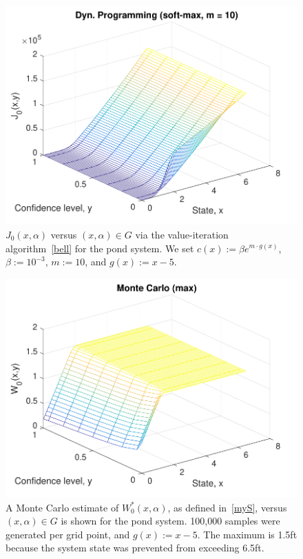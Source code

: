 \documentclass[letterpaper, 10 pt, conference]{ieeeconf}  %
\begin{document}
\begin{figure}[thpb]
      \centering
      \includegraphics[scale=0.5]{dyn_prog_J0_sept112018.pdf}
      \caption{$J_0(x,\alpha)$ versus $(x, \alpha) \in G$ via the value-iteration algorithm~\eqref{bell} for the pond system.
	  We set $c(x) := \beta e^{m\cdot g(x)}$, $\beta := 10^{-3}$, $m := 10$, and $g(x) := x-5$.}
      \label{J0dp}
\end{figure}

\begin{figure}[thpb]
      \centering
      \includegraphics[scale=0.5]{monte_carlo_max_sept112018.pdf}
      \caption{A Monte Carlo estimate of $W_0^*(x,\alpha)$, as defined in~\eqref{myS}, versus $(x, \alpha) \in G$ is shown for the pond system.
	  100,000 samples were generated per grid point, and $g(x) := x - 5$. 
	  The maximum is 1.5ft because the system state was prevented from exceeding 6.5ft.}
      \label{W0mc}
\end{figure}
\end{document}
